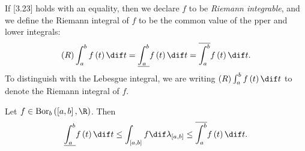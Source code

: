 \documentclass[pmath450]{subfiles}
\begin{document}
    If [3.23] holds with an equality, then we declare $f$ to be \textit{Riemann integrable}, and we define the Riemann integral of $f$ to be the common value of the pper and lower integrals:
    \begin{equation*}
        \left( R \right)\int^b_a f\left( t \right)\dif t = \underline{\int_{a}^b}f\left( t \right)\dif t = \overline{\int_{a}^b}f\left( t \right)\dif t.
    \end{equation*}
    To distinguish with the Lebesgue integral, we are writing $\left( R \right)\int^b_af\left( t \right)\dif t$ to denote the Riemann integral of $f$.

    \begin{prop}{}
        Let $f\in\bor_b\left( \left[ a,b \right],\R \right)$. Then
        \begin{equation}
            \underline{\int_{a}^b}f\left( t \right)\dif t \leq \int_{\left[ a,b \right]}f\dif\lambda_{\left[ a,b \right]} \leq \overline{\int_{a}^b}f\left( t \right)\dif t.
        \end{equation}
    \end{prop}
\end{document}
